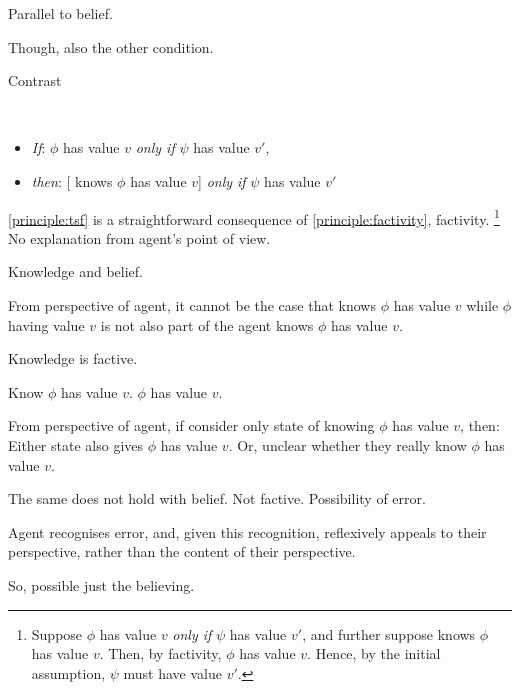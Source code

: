\begin{note}
  Parallel to belief.

  Though, also the other condition.

  Contrast

  \begin{principle}\mbox{ }\vspace{-\baselineskip}
    \label{principle:tsf}
    \begin{itemize}[noitemsep]
    \item[]
      \emph{If}:
      \(\phi\) has value \(v\) \emph{only if} \(\psi\) has value \(v'\),
    \item[]
      \emph{then}:
      [\vAgent{} knows \(\phi\) has value \(v\)] \emph{only if} \(\psi\) has value \(v'\)
    \end{itemize}
  \end{principle}

  \autoref{principle:tsf} is a straightforward consequence of \autoref{principle:factivity}, factivity.%
  \footnote{
    Suppose \(\phi\) has value \(v\) \emph{only if} \(\psi\) has value \(v'\), and further suppose \vAgent{} knows \(\phi\) has value \(v\).
    Then, by factivity, \(\phi\) has value \(v\).
    Hence, by the initial assumption, \(\psi\) must have value \(v'\).
  }
  No explanation from agent's point of view.
\end{note}

\begin{note}
  Knowledge and belief.

  From perspective of agent, it cannot be the case that knows \(\phi\) has value \(v\) while \(\phi\) having value \(v\) is not also part of \qWhy{} the agent knows \(\phi\) has value \(v\).

  Knowledge is factive.

  Know \(\phi\) has value \(v\).
  \(\phi\) has value \(v\).

  From perspective of agent, if consider only state of knowing \(\phi\) has value \(v\), then:
  Either state also gives \(\phi\) has value \(v\).
  Or, unclear whether they really know \(\phi\) has value \(v\).

  The same does not hold with belief.
  Not factive.
  Possibility of error.

  Agent recognises error, and, given this recognition, reflexively appeals to their perspective, rather than the content of their perspective.

  So, possible just the believing.
\end{note}

